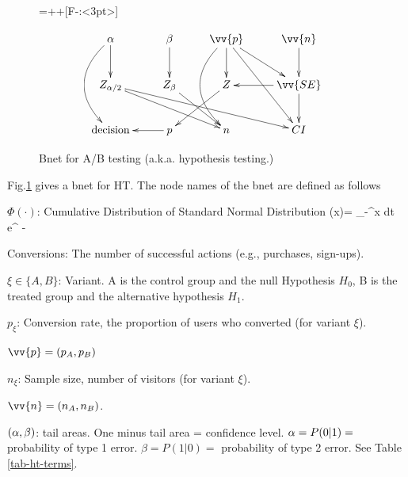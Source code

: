 \begin{figure}[h!]

{\entrymodifiers={++[F-:<3pt>]}

$$\xymatrix@R=25pt{
\alp\ar@/_2pc/[dd]\ar[d]
&
\beta\ar[d]
&
\vv{p}\ar@/_2pc/[dd]
\ar[dr]
\ar[d]
\ar[ddr]
&\vv{n}\ar[d]
\\
Z_{\alp/2}\ar[drr]
\ar[drrr]
&Z_\beta\ar[dr]
&Z\ar[dl]
&\vv{SE}\ar[l]\ar[d]
\\
\text{decision}
&p\ar[l]
&n
&CI
}$$
}
\caption{Bnet for A/B testing (a.k.a. 
hypothesis testing.)}
\label{fig-bnet-hypo-test}
\end{figure}

Fig.\ref{fig-bnet-hypo-test}
gives a bnet for HT. The node names 
of the bnet are defined as follows

$\Phi(\cdot)$: Cumulative Distribution
of Standard Normal Distribution
\beq
\Phi (x)=
\int_{-\infty}^x dt\; e^{
-}
\eeq

Conversions: The number of successful actions (e.g., purchases, sign-ups). 

$\xi\in\{A,B\}$: Variant. A is the control group
and the null Hypothesis $H_0$, B is 
the treated group
and the alternative hypothesis $H_1$.
 
$p_\xi$: Conversion rate, the proportion of users who converted (for variant $\xi$).

$\vv{p}=(p_A, p_B)$

$n_\xi$: Sample size, number of visitors
(for variant $\xi$).
   
$\vv{n}=(n_A, n_B)$.

$(\alpha, \beta)$: tail areas. One minus tail area = confidence level. $\alpha=P(0|1)=$ probability of type 1 error. $\beta=P(1|0)=$
probability of type 2 error. See Table
\ref{tab-ht-terms}.

